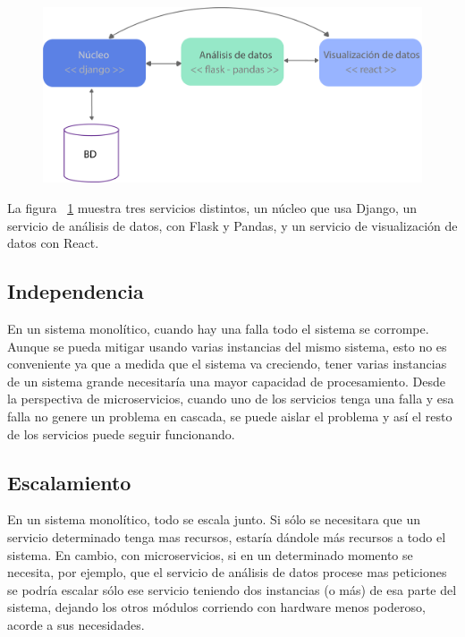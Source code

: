 \begin{figure}[h!]
  \centering
    \includegraphics{images/heterogeneidad-tecnologica.png}
  \label{fig:microht}
\end{figure}

\break

La figura ~\ref{fig:microht} muestra tres servicios distintos, un núcleo que usa Django, un servicio de análisis de datos, con Flask y Pandas, y un servicio de visualización de datos con React.

\subsection[Independencia]{Independencia}

En un sistema monolítico, cuando hay una falla todo el sistema se corrompe. Aunque se pueda mitigar usando varias instancias del mismo sistema, esto no es conveniente ya que a medida que el sistema va creciendo, tener varias instancias de un sistema grande necesitaría una mayor capacidad de procesamiento.
Desde la perspectiva de microservicios, cuando uno de los servicios tenga una falla y esa falla no genere un problema en cascada, se puede aislar el problema y así el resto de los servicios puede seguir funcionando. 

\subsection[Escalamiento]{Escalamiento}

En un sistema monolítico, todo se escala junto. Si sólo se necesitara que un servicio determinado tenga mas recursos, estaría dándole más recursos a todo el sistema.
En cambio, con microservicios, si en un determinado momento se necesita, por ejemplo, que el servicio de análisis de datos procese mas peticiones se podría escalar sólo ese servicio teniendo dos instancias (o más) de esa parte del sistema, dejando los otros módulos corriendo con hardware menos poderoso, acorde a sus necesidades.

